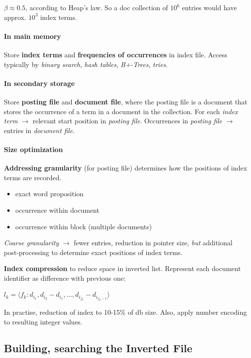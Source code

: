 $\beta \approx 0.5$, according to Heap's law. So a doc collection of $10^6$ entries would have approx. $10^3$ index terms.

\paragraph{In main memory} Store \textbf{index terms} and \textbf{frequencies of occurrences} in index file. Access typically by \emph{binary search}, \emph{hash tables}, \emph{B+-Trees}, \emph{tries}.
\paragraph{In secondary storage} Store \textbf{posting file} and \textbf{document file}, where the posting file is a document that stores the occurrence of a term in a document in the collection. For each \emph{index term} $\longrightarrow$ relevant start position in \emph{posting file}. Occurrences in \emph{posting file} $\longrightarrow$ entries in \emph{document file}.

\paragraph{Size optimization} \textbf{Addressing granularity} (for posting file) determines how the positions of index terms are recorded.
\begin{itemize}
  \item exact word proposition
  \item occurrence within document
  \item occurrence within block (multiple documents)
\end{itemize}
\emph{Coarse granularity} $\rightarrow$ fewer entries, reduction in pointer size, \emph{but} additional post-processing to determine exact positions of index terms.

\textbf{Index compression} to reduce space in inverted list. Represent each document identifier as difference with previous one:
\begin{center}
  $l_k = \langle f_k: d_{i_1}, d_{i_2} - d_{i_1}, ..., d_{i_{f_k}} - d_{i_{f_k - 1}} \rangle$
\end{center}
In practise, reduction of index to 10-15\% of db size. Also, apply number encoding to resulting integer values.

\subsection{Building, searching the Inverted File}

